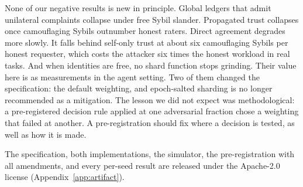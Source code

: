 None of our negative results is new in principle. Global ledgers that
admit unilateral complaints collapse under free Sybil slander. Propagated
trust collapses once camouflaging Sybils outnumber honest raters. Direct
agreement degrades more slowly. It falls behind self-only trust at about
six camouflaging Sybils per honest requester, which costs the attacker
six times the honest workload in real tasks. And when
identities are free, no shard function stops grinding. Their value here is
as measurements in the agent setting. Two of them changed the
specification: the default weighting, and epoch-salted sharding is no
longer recommended as a mitigation. The
lesson we did not expect was methodological: a
pre-registered decision rule applied at one adversarial fraction chose a
weighting that failed at another. A pre-registration should fix where a
decision is tested, as well as how it is made.

The specification, both implementations, the simulator, the
pre-registration with all amendments, and every per-seed result are
released under the Apache-2.0 license (Appendix~\ref{app:artifact}).
